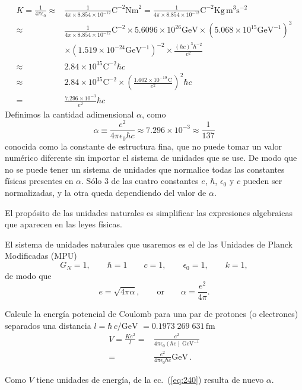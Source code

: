 \begin{frame}
\begin{align*}
  K=\frac{1}{4\pi\epsilon_0}\approx&\frac{1}{4\pi\times8.854\times10^{-12}}\text{C}^{-2}\text{Nm}^2
  =\frac{1}{4\pi\times8.854\times10^{-12}}\text{C}^{-2}\text{Kg}\,\text{m}^3\text{s}^{-2}\\
  \approx&\frac{1}{4\pi\times8.854\times10^{-12}}\text{C}^{-2}\times5.6096\times10^{26}\text{GeV}
  \times(5.068\times10^{15}\text{GeV}^{-1})^3\\
  &\times(1.519\times10^{-24}\text{GeV}^{-1})^{-2}\times\frac{(\hbar c)^3\hbar^{-2}}{c^2}\\
  \approx&2.84\times10^{35}\text{C}^{-2}\hbar c\\
  \approx&2.84\times10^{35}\text{C}^{-2}\times
  \left(
    \frac{1.602\times10^{-19}\,\text{C}}{e^2}
  \right)^2\hbar c\\
  =&\frac{7.296\times10^{-3}}{e^2}\hbar c
\end{align*}
Definimos la cantidad adimensional $\alpha$, como
\begin{equation*}
  \alpha\equiv\frac{e^2}{4\pi\epsilon_0\hbar c}
\approx7.296\times10^{-3}\approx\frac{1}{137}
\end{equation*}
conocida como la constante de estructura fina, que no puede tomar un
valor numérico diferente sin importar el sistema de unidades que se
use. De modo que no se puede tener un sistema de unidades que
normalice todas las constantes físicas presentes en
$\alpha$. Sólo 3 de las cuatro constantes $e$, $\hbar$, $\epsilon_0$
y $c$ pueden ser normalizadas, y la otra queda dependiendo del valor
de $\alpha$.

El propósito de las unidades naturales es simplificar las expresiones algebraicas que aparecen en las leyes físicas. 

El sistema de unidades naturales que usaremos es el de las Unidades de Planck Modificadas (MPU)
\begin{equation}
  G_N=1,\qquad \hbar=1 \qquad c=1,\qquad \epsilon_0=1,\qquad k=1,
\end{equation}
de modo que
\begin{equation}
  e=\sqrt{4\pi\alpha},\qquad\text{or}\qquad \alpha=\frac{e^2}{4\pi}.
\end{equation}
  

\begin{example}
  Calcule la energía potencial de Coulomb para una par de protones (o electrones) separados una distancia $l=\hbar\,c/\text{GeV}$ $=0.1973\;269\;631\,\text{fm}$
  \begin{align}
    \label{eq:240}
    V=\frac{K e^2}{l}=&\frac{e^2}{4\pi\epsilon_0(\hbar c)\,\text{GeV}^{-1}}\nonumber\\
    =&\frac{e^2}{4\pi\epsilon_0\hbar c}\text{GeV}\,.
  \end{align}
\end{example}
Como $V$ tiene unidades de energía, de la ec.~(\ref{eq:240}) resulta de nuevo $\alpha$.
\end{frame}
